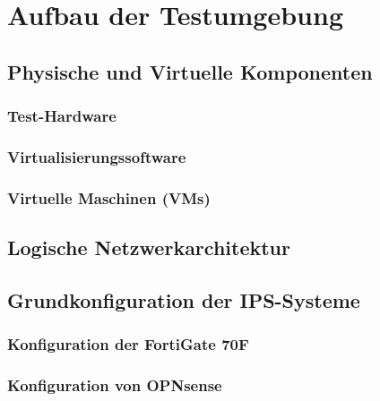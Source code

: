 \chapter{Aufbau der Testumgebung}
\section{Physische und Virtuelle Komponenten}
\subsection{Test-Hardware}
\subsection{Virtualisierungssoftware}
\subsection{Virtuelle Maschinen (VMs)}

\section{Logische Netzwerkarchitektur}

\section{Grundkonfiguration der IPS-Systeme}
\subsection{Konfiguration der FortiGate 70F}
\subsection{Konfiguration von OPNsense}